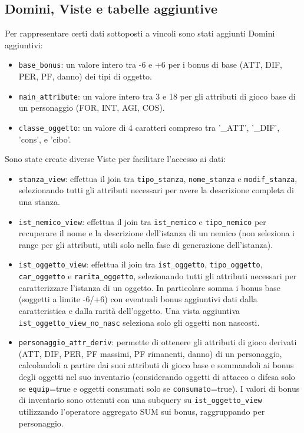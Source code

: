 \documentclass[10pt,a4paper]{article}
\begin{document}
\subsection{Domini, Viste e tabelle aggiuntive}
Per rappresentare certi dati sottoposti a vincoli sono stati aggiunti Domini aggiuntivi:
\begin{itemize}[leftmargin=*]
  \item[] \texttt{base\_bonus}: un valore intero tra -6 e +6 per i bonus di base (ATT, DIF, PER, PF, danno) dei tipi di oggetto.
  \item[] \texttt{main\_attribute}: un valore intero tra 3 e 18 per gli attributi di gioco base di un personaggio (FOR, INT, AGI, COS).
  \item[] \texttt{classe\_oggetto}: un valore di 4 caratteri compreso tra '\_ATT', '\_DIF', 'cons', e 'cibo'.
\end{itemize}
Sono state create diverse Viste per facilitare l'accesso ai dati:
\begin{itemize}[leftmargin=*]
  \item[] \texttt{stanza\_view}: effettua il join tra \texttt{tipo\_stanza}, \texttt{nome\_stanza} e \texttt{modif\_stanza}, selezionando tutti gli attributi necessari per avere la descrizione completa di una stanza.
  \item[] \texttt{ist\_nemico\_view}: effettua il join tra \texttt{ist\_nemico} e \texttt{tipo\_nemico} per recuperare il nome e la descrizione dell'istanza di un nemico (non seleziona i range per gli attributi, utili solo nella fase di generazione dell'istanza).
  \item[] \texttt{ist\_oggetto\_view}: effettua il join tra \texttt{ist\_oggetto}, \texttt{tipo\_oggetto}, \texttt{car\_oggetto} e \texttt{rarita\_oggetto}, selezionando tutti gli attributi necessari per caratterizzare l'istanza di un oggetto. In particolare somma i bonus base (soggetti a limite -6/+6) con eventuali bonus aggiuntivi dati dalla caratteristica e dalla rarità dell'oggetto. Una vista aggiuntiva \texttt{ist\_oggetto\_view\_no\_nasc} seleziona solo gli oggetti non nascosti.
  \item[] \texttt{personaggio\_attr\_deriv}: permette di ottenere gli attributi di gioco derivati (ATT, DIF, PER, PF massimi, PF rimanenti, danno) di un personaggio, calcolandoli a partire dai suoi attributi di gioco base e sommandoli ai bonus degli oggetti nel suo inventario (considerando oggetti di attacco o difesa solo se \texttt{equip}=true e oggetti consumati solo se \texttt{consumato}=true). I valori di bonus di inventario sono ottenuti con una subquery su \texttt{ist\_oggetto\_view} utilizzando l'operatore aggregato SUM sui bonus, raggruppando per personaggio.
\end{itemize}
\end{document}
